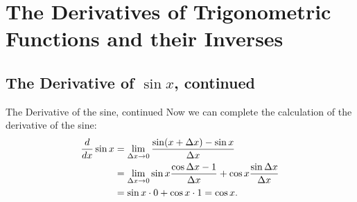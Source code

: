 \chapter{The Derivatives of Trigonometric Functions and their Inverses}



\section{The Derivative of $\sin x$, continued}{}
{The Derivative of the sine, continued}
\nobreak
Now we can complete the calculation of the derivative of the sine:
\begin{align*}
{d\over dx}\sin x &= \lim_{\Delta x\to0} {\sin(x+\Delta x)-\sin x
  \over \Delta x} \\
&=\lim_{\Delta x\to0} 
\sin x{\cos \Delta x - 1\over \Delta x}+\cos x{\sin\Delta x\over
  \Delta x} \\
&=\sin x \cdot 0 + \cos x \cdot 1 = \cos x. \\
\end{align*}

